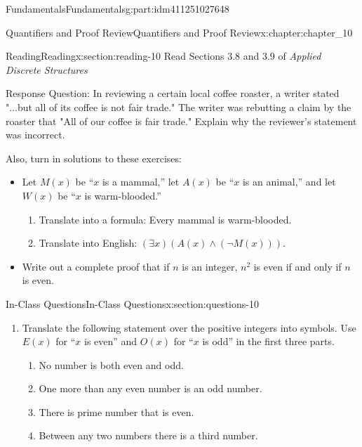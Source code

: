 \documentclass[oneside,10pt,]{book}
\numberwithin{equation}{section}
\begin{document}
\begin{partptx}{Fundamentals}{}{Fundamentals}{}{}{g:part:idm411251027648}
\begin{chapterptx}{Quantifiers and Proof Review}{}{Quantifiers and Proof Review}{}{}{x:chapter:chapter_10}
\index{}%
%
%
\typeout{************************************************}
\typeout{************************************************}
%
\begin{sectionptx}{Reading}{}{Reading}{}{}{x:section:reading-10}
Read Sections 3.8 and 3.9 of \emph{Applied Discrete Structures}%
\par
Response Question: In reviewing a certain local coffee roaster, a writer stated  "...but all of its coffee is not fair trade." The writer was rebutting a claim by the roaster that "All of our coffee is fair trade."  Explain why the reviewer's statement was incorrect.%
\par
Also, turn in solutions to these exercises:%
\begin{itemize}[label=\textbullet]
\item{}Let \(M(x)\) be ``\(x\) is a mammal,'' let \(A(x)\) be ``\(x\) is an animal,'' and let \(W(x)\) be ``\(x\) is warm-blooded.''%
\par
%
\begin{enumerate}[label=(\alph*)]
\item{}Translate into a formula: Every mammal is warm-blooded.%
\item{}Translate into English: \((\exists x)(A(x) \land  (\neg M(x)))\).%
\end{enumerate}
%
\item{}Write out a complete proof that if \(n\) is an integer, \(n^2\) is even if and only if \(n\) is even.%
\end{itemize}
%
\end{sectionptx}
%
%
\typeout{************************************************}
\typeout{************************************************}
%
\begin{sectionptx}{In-Class Questions}{}{In-Class Questions}{}{}{x:section:questions-10}
%
\begin{enumerate}[label=\arabic*.]
\item{}Translate the following statement over the positive integers into symbols. Use \(E(x)\) for ``\(x\) is even'' and \(O(x)\) for ``\(x\) is odd'' in the first three parts.%
\begin{enumerate}[label=(\alph*)]
\item{}No number is both even and odd.%
\item{}One more than any even number is an odd number.%
\item{}There is prime number that is even.%
\item{}Between any two numbers there is a third number.%

\end{enumerate}
\end{enumerate}
\end{sectionptx}
\end{chapterptx}
\end{partptx}
\end{document}
